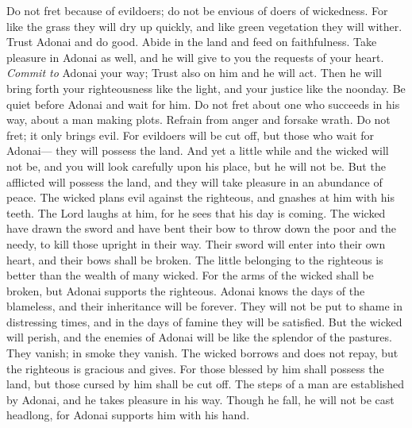 \begin{biblechapter} %
 Do not fret because of evildoers; 
do not be envious of doers of wickedness.
\verse For like the grass they will dry up quickly, 
and like green vegetation they will wither.
\verse Trust Adonai and do good. 
Abide in the land and feed on faithfulness.
\verse Take pleasure in Adonai as well, 
and he will give to you the requests of your heart.
\verse \textit{Commit to} Adonai your way; 
Trust also on him and he will act.
\verse Then he will bring forth your righteousness like the light, 
and your justice like the noonday.
\verse Be quiet before Adonai and wait for him. 
Do not fret about one who succeeds in his way, 
about a man making plots.
\verse Refrain from anger and forsake wrath. 
Do not fret; it only brings evil.
\verse For evildoers will be cut off, 
but those who wait for Adonai— 
they will possess the land.
\verse And yet a little while and the wicked will not be, 
and you will look carefully upon his place, but he will not be.
\verse But the afflicted will possess the land, 
and they will take pleasure in an abundance of peace.
\verse The wicked plans evil against the righteous, 
and gnashes at him with his teeth.
\verse The Lord laughs at him, 
for he sees that his day is coming.
\verse The wicked have drawn the sword and have bent their bow 
to throw down the poor and the needy, 
to kill those upright in their way.
\verse Their sword will enter into their own heart, 
and their bows shall be broken.
\verse The little belonging to the righteous is better 
than the wealth of many wicked.
\verse For the arms of the wicked shall be broken, 
but Adonai supports the righteous.
\verse Adonai knows the days of the blameless, 
and their inheritance will be forever.
\verse They will not be put to shame in distressing times, 
and in the days of famine they will be satisfied.
\verse But the wicked will perish, 
and the enemies of Adonai will be like the splendor of the pastures. 
They vanish; in smoke they vanish.
\verse The wicked borrows and does not repay, 
but the righteous is gracious and gives.
\verse For those blessed by him shall possess the land, 
but those cursed by him shall be cut off.
\verse The steps of a man are established by Adonai, 
and he takes pleasure in his way.
\verse Though he fall, he will not be cast headlong, 
for Adonai supports him with his hand.

\end{biblechapter}
